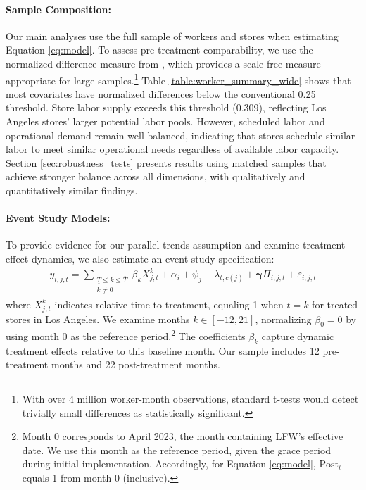 \documentclass[letterpaper,11pt,leqno]{article}
\theoremstyle{paper}
\begin{document}
\paragraph{Sample Composition:} 
Our main analyses use the full sample of workers and stores when estimating Equation \ref{eq:model}. To assess pre-treatment comparability, we use the normalized difference measure from \cite{imbens2015causal}, which provides a scale-free measure appropriate for large samples.\footnote{With over 4 million worker-month observations, standard t-tests would detect trivially small differences as statistically significant.} Table \ref{table:worker_summary_wide} shows that most covariates have normalized differences below the conventional 0.25 threshold. Store labor supply exceeds this threshold (0.309), reflecting Los Angeles stores' larger potential labor pools. However, scheduled labor and operational demand remain well-balanced, indicating that stores schedule similar labor to meet similar operational needs regardless of available labor capacity. Section \ref{sec:robustness_tests} presents results using matched samples that achieve stronger balance across all dimensions, with qualitatively and quantitatively similar findings.

\paragraph{Event Study Models:}
To provide evidence for our parallel trends assumption and examine treatment effect dynamics, we also estimate an event study specification:
\begin{align}
y_{i,j,t}=\sum_{\substack{\underline{T}\leq k\leq\overline{T}\\k\neq 0}}\beta_{k}X_{j,t}^{k}+ \alpha_{i} + \psi_j +  \lambda_{t,c(j)} +  \bm{\gamma}\Pi_{i,j,t} + \varepsilon_{i,j,t}\label{eq:model_dynamic}
\end{align}
where $X_{j,t}^{k}$ indicates relative time-to-treatment, equaling 1 when $t=k$ for treated stores in Los Angeles. We examine months $k \in [-12,21]$, normalizing $\beta_{0}=0$ by using month 0 as the reference period.\footnote{Month 0 corresponds to April 2023, the month containing LFW's effective date. We use this month as the reference period, given the grace period during initial implementation. Accordingly, for Equation \ref{eq:model}, $\text{Post}_{t}$ equals 1 from month 0 (inclusive).} The coefficients $\beta_k$ capture dynamic treatment effects relative to this baseline month. Our sample includes 12 pre-treatment months and 22 post-treatment months.
\end{document}
